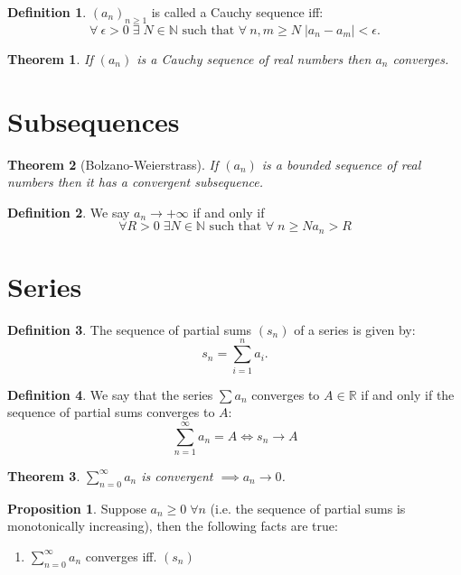 \documentclass[11pt,a4paper]{article}
\newcommand\R{\mathbb{R}}
\newcommand\N{\mathbb{N}}
\newcommand\st{\text{ such that }}
\newcommand\sumOfSeries{\sum_{n = 0}^{\infty}}
\newtheorem{theorem}{Theorem}
\theoremstyle{definition}
\newtheorem{definition}{Definition}
\newtheorem{proposition}{Proposition}
\begin{document}
\begin{definition}
    $ (a_n)_{n \geq 1} $ is called a Cauchy sequence iff: 
    \[ \forall \: \epsilon > 0 \; \exists \; N \in \N \st \forall \: n, m \geq N \; |a_n - a_m| < \epsilon. \]
\end{definition}

\begin{theorem}
    If $ (a_n) $ is a Cauchy sequence of real numbers then $ a_n $ converges.
\end{theorem}

\section{Subsequences}

\begin{theorem}[Bolzano-Weierstrass]
    If $ (a_n) $ is a bounded sequence of real numbers then it has a convergent subsequence.
\end{theorem}

\begin{definition}
    We say $ a_n \to +\infty $ if and only if 
    \[ \forall R > 0 \; \exists N \in \N \st \forall \; n \geq N a_n > R\] 
\end{definition}

\section{Series}

\begin{definition}
    The sequence of partial sums $ (s_n) $ of a series is given by:
    \[ s_n = \sum_{i=1}^n a_i.\]
\end{definition}

\begin{definition}
    We say that the series $ \sum a_n $ converges to $ A \in \R $ if and only if the sequence of partial sums converges to $ A $:
    \[ \sum_{n = 1}^{\infty} a_n = A \iff s_n \to A \]
\end{definition}

\begin{theorem}
    $ \sumOfSeries a_n $ is convergent $ \implies a_n \to 0$.
\end{theorem}

\begin{proposition}
    Suppose $a_n \geq 0 \; \forall n $ (i.e. the sequence of partial sums is monotonically increasing), then the following facts are true:
    \begin{enumerate}
        \item $ \sumOfSeries a_n $ converges iff. $(s_n) $
    \end{enumerate}
\end{proposition}
\end{document}
